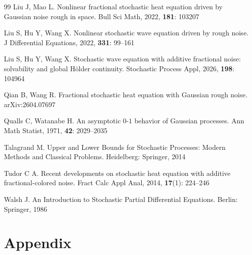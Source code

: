 \documentclass[11pt,reqno]{amsart}
\renewcommand{\theequation}
    {\arabic{section}.\arabic{equation}}
\numberwithin{equation}{section}
\newcommand{\1}{{\bf 1}}
\newcommand{\2}{{\bf 2}}
\begin{document}
\begin{thebibliography}{99}
 Liu J, Mao  L.
 Nonlinear fractional stochastic heat equation driven by Gaussian noise rough in space.
 Bull Sci Math, 2022, {\bf 181}:   103207



Liu S, Hu Y, Wang X.
Nonlinear stochastic wave equation driven by rough noise.
J Differential Equations, 2022, {\bf  331}: 99--161





Liu S, Hu Y, Wang X.
Stochastic wave equation with additive fractional noise: solvability and global H\"older continuity.
  Stochastic Process   Appl, 2026, {\bf 198}: 104964  
 



Qian B, Wang R.
Fractional stochastic heat equation with Gaussian rough noise.  arXiv:2604.07697






Qualls C, Watanabe H.
An asymptotic $0$-$1$ behavior of Gaussian processes.
Ann Math Statist, 1971, {\bf 42}: 2029--2035

 



Talagrand M.
Upper and Lower Bounds for Stochastic Processes:   Modern Methods and Classical Problems. Heidelberg: Springer, 2014 




Tudor C A.
Recent developments on stochastic heat equation with additive fractional-colored noise.
Fract Calc Appl Anal, 2014,  {\bf 17}(1): 224--246





Walsh J.
 An Introduction to Stochastic Partial Differential Equations. Berlin: Springer, 1986

  


\end{thebibliography}





\renewcommand{\thesection}{A}  %
\renewcommand{\thelemma}{A.\arabic{lemma}}  %
\renewcommand{\theequation}{A.\arabic{equation}}  %
\setcounter{equation}{0}  %
\setcounter{theorem}{0}  %
\section*{Appendix}  %
\end{document}
